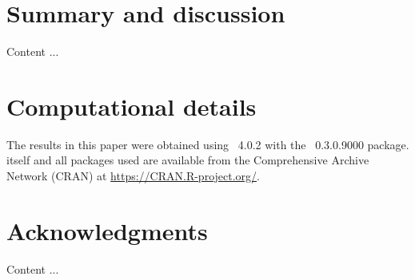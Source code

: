 \documentclass[article]{jss}
\begin{document}

\section{Summary and discussion} \label{sec:summary}

Content ...


\section*{Computational details}

The results in this paper were obtained using
~4.0.2 with the
~0.3.0.9000 package.  itself
and all packages used are available from the Comprehensive
 Archive Network (CRAN) at \url{https://CRAN.R-project.org/}.


\section*{Acknowledgments}
Content ...





% 
% 
% 
% 
% 
\end{document}
